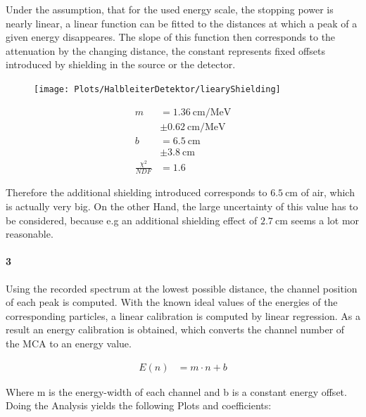 \documentclass[12pt,twoside,a4paper]{scrartcl}
\begin{document}
		Under the assumption, that for the used energy scale, the stopping power is nearly linear, a linear function can be fitted to the distances at which a peak of a given energy disappeares. The slope of this function then corresponds to the attenuation by the changing distance, the constant represents fixed offsets introduced by shielding in the source or the detector.

		\begin{figure}[H]
				\begin{minipage}{0.69 \textwidth}
					\texttt{[image: Plots/HalbleiterDetektor/liearyShielding]}
				\end{minipage}
				\begin{minipage}{0.29 \textwidth}
					\begin{align*}
						m &= \SI{1.36}{\centi \metre \per \mega \electronvolt}\\ &\pm \SI{0.62}{\centi \metre \per \mega \electronvolt} \\
						b &= \SI{6.5}{\centi \metre}\\ &\pm \SI{3.8}{\centi \metre} \\
						\frac{\chi^2}{NDF} &= 1.6
					\end{align*}
				\end{minipage}
			\end{figure}

		Therefore the additional shielding introduced corresponds to $\SI{6.5}{\centi \metre}$ of air, which is actually very big. On the other Hand, the large uncertainty of this value has to be considered, because e.g an additional shielding effect of $\SI{2.7}{\centi \metre}$ seems a lot mor reasonable.

		\paragraph{3}
			Using the recorded spectrum at the lowest possible distance, the channel position of each peak is computed. With the known ideal values of the energies of the corresponding particles, a linear calibration is computed by linear regression. As a result an energy calibration is obtained, which converts the channel number of the MCA to an energy value.

			\begin{align}
					E(n) &= m \cdot n + b
			\end{align}

			Where m is the energy-width of each channel and b is a constant energy offset.
			Doing the Analysis yields the following Plots and coefficients:
\end{document}
